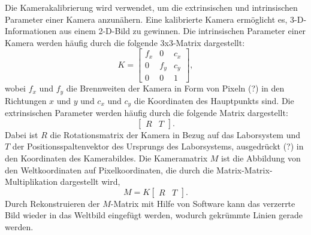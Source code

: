 \documentclass[arbeit=studie,oneside,BCOR=12mm]{ArbeitRST}
\begin{document}
Die Kamerakalibrierung wird verwendet, um die extrinsischen und intrinsischen
Parameter einer Kamera anzunähern. Eine kalibrierte Kamera ermöglicht es,
3-D-Informationen aus einem 2-D-Bild zu gewinnen. Die intrinsischen Parameter
einer Kamera werden häufig durch die folgende 3x3-Matrix dargestellt:
\begin{equation} 
    K = 
    \begin{bmatrix} 
        f_x & 0 & c_x\\ 
        0 & f_y & c_y\\ 
        0 & 0 & 1
    \end{bmatrix}, 
\end{equation} 
wobei $f_x$ und $f_y$ die Brennweiten der Kamera in Form von Pixeln (?) in den
Richtungen $x$ und $y$ und $c_x$ und $c_y$ die Koordinaten des Hauptpunkts
sind. Die extrinsischen Parameter werden häufig durch die folgende Matrix
dargestellt: 
\begin{equation}
    \begin{bmatrix} R & T \end{bmatrix}. 
\end{equation} 
Dabei ist $R$ die Rotationsmatrix der Kamera in Bezug auf das Laborsystem und $T$
der Positionsspaltenvektor des Ursprungs des Laborsystems, ausgedrückt (?) in den
Koordinaten des Kamerabildes. Die Kameramatrix $M$ ist die Abbildung von
den Weltkoordinaten auf Pixelkoordinaten, die durch die
Matrix-Matrix-Multiplikation dargestellt wird, 
\begin{equation} 
    M = K 
    \begin{bmatrix} 
        R & T
    \end{bmatrix}. 
\end{equation} 
Durch Rekonstruieren der $M$-Matrix mit Hilfe von Software kann das verzerrte
Bild wieder in das Weltbild eingefügt werden, wodurch gekrümmte Linien gerade
werden.
\end{document}
